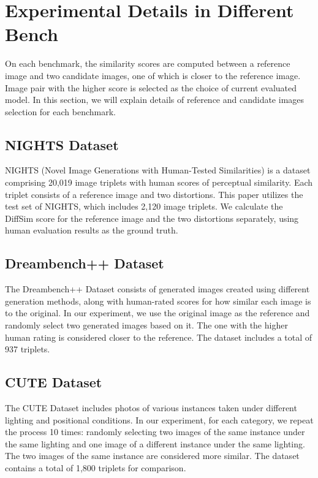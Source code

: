 \clearpage
\setcounter{page}{1}
\maketitlesupplementary


\section{Experimental Details in Different Bench}
\label{sec:rationale}

On each benchmark, the similarity scores are computed between a reference image and two candidate images, one of which is closer to the reference image. Image pair with the higher score is selected as the choice of current evaluated model. In this section, we will explain details of reference and candidate images selection for each benchmark.

\subsection{NIGHTS Dataset}
NIGHTS (Novel Image Generations with Human-Tested Similarities) is a dataset comprising 20,019 image triplets with human scores of perceptual similarity. Each triplet consists of a reference image and two distortions. This paper utilizes the test set of NIGHTS, which includes 2,120 image triplets. We calculate the DiffSim score for the reference image and the two distortions separately, using human evaluation results as the ground truth.

\subsection{Dreambench++ Dataset}

The Dreambench++ Dataset consists of generated images created using different generation methods, along with human-rated scores for how similar each image is to the original. In our experiment, we use the original image as the reference and randomly select two generated images based on it. The one with the higher human rating is considered closer to the reference. The dataset includes a total of 937 triplets.

\subsection{CUTE Dataset}

The CUTE Dataset includes photos of various instances taken under different lighting and positional conditions. In our experiment, for each category, we repeat the process 10 times: randomly selecting two images of the same instance under the same lighting and one image of a different instance under the same lighting. The two images of the same instance are considered more similar. The dataset contains a total of 1,800 triplets for comparison.

